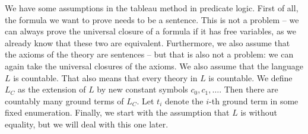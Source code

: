 We have some assumptions in the tableau method in predicate logic. First of all, the formula we want to prove needs to be a sentence. This is not a problem -- we can always prove the universal closure of a formula if it has free variables, as we already know that these two are equivalent. Furthermore, we also assume that the axioms of the theory are sentences -- but that is also not a problem: we can again take the universal closures of the axioms. We also assume that the language $L$ is countable. That also means that every theory in $L$ is countable. We define $L_C$ as the extension of $L$ by new constant symbols $c_0, c_1, \dots$. Then there are countably many ground terms of $L_C$. Let $t_i$ denote the $i$-th ground term in some fixed enumeration. Finally, we start with the assumption that $L$ is without equality, but we will deal with this one later.

